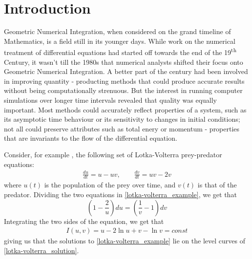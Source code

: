 \documentclass[a4paper, 12pt]{article}
\begin{document}
\section{Introduction}

Geometric Numerical Integration, when considered on the grand timeline of Mathematics, is a field still in its younger days. While work on the numerical treatment of differential equations had started off towards the end of the 19\textsuperscript{th} Century, it wasn't till the 1980s that numerical analysts shifted their focus onto Geometric Numerical Integration.  A  better part of the century had been involved in improving quantity -  producting methods that could produce accurate results without being computationally strenuous. But the interest in running computer simulations over longer time intervals revealed that quality was equally important. Most methods could accurately reflect properties of a system, such as its asymptotic time behaviour or its sensitivity to changes in initial conditions; not all could preserve attributes such as total enery or momentum - properties that are invariants to the flow of the differential equation.

Consider, for example \cite{Hairer2006}, the following set of Lotka-Volterra prey-predator equations:
\begin{eqnarray}
	\frac{du}{dt} = u - uv, \qquad \frac{dv}{dt} = uv - 2v \label{lotka-volterra_example}
\end{eqnarray} where $u(t)$ is the population of the prey over time, and $v(t)$ is that of the predator. Dividing the two equations in \ref{lotka-volterra_example}, we get that
$$
\left(1 -  \frac{2}{u}\right) du = \left(\frac{1}{v} - 1\right) dv
$$
Integrating the two sides of the equation, we get that
\begin{eqnarray}
I(u, v) = u - 2\ln{u} +  v - \ln{v} = const \label{lotka-volterra_solution}
\end{eqnarray}
giving us that the solutions to \ref{lotka-volterra_example} lie on the level curves of \ref{lotka-volterra_solution}.
\end{document}
